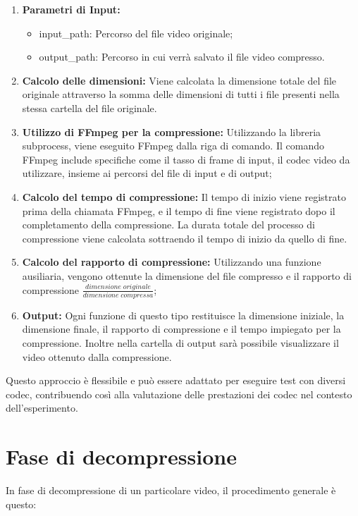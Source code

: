 \begin{enumerate}
    \item \textbf{Parametri di Input:}
    \begin{itemize}
        \item input\_path: Percorso del file video originale;
        \item output\_path: Percorso in cui verrà salvato il file video compresso.
    \end{itemize}
    \item \textbf{Calcolo delle dimensioni:} Viene calcolata la dimensione totale del file originale attraverso la somma delle dimensioni di tutti i file presenti nella stessa cartella del file originale.
    \item \textbf{Utilizzo di FFmpeg per la compressione:} Utilizzando la libreria subprocess, viene eseguito FFmpeg dalla riga di comando. Il comando FFmpeg include specifiche come il tasso di frame di input, il codec video da utilizzare, insieme ai percorsi del file di input e di output;
    \item \textbf{Calcolo del tempo di compressione:} Il tempo di inizio viene registrato prima della chiamata FFmpeg, e il tempo di fine viene registrato dopo il completamento della compressione. La durata totale del processo di compressione viene calcolata sottraendo il tempo di inizio da quello di fine.
    \item \textbf{Calcolo del rapporto di compressione:} Utilizzando una funzione ausiliaria, vengono ottenute la dimensione del file compresso e il rapporto di compressione $\frac{dimensione\;originale}{dimensione \;compressa}$;
    \item \textbf{Output:} Ogni funzione di questo tipo restituisce la dimensione iniziale, la dimensione finale, il rapporto di compressione e il tempo impiegato per la compressione. Inoltre nella cartella di output sarà possibile visualizzare il video ottenuto dalla compressione.
\end{enumerate}
 Questo approccio è flessibile e può essere adattato per eseguire test con diversi codec, contribuendo così alla valutazione delle prestazioni dei codec nel contesto dell'esperimento.

\section{Fase di decompressione}
In fase di decompressione di un particolare video, il procedimento generale è questo:

